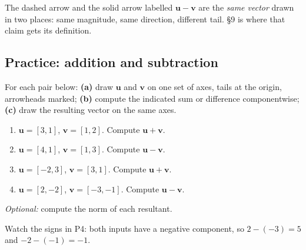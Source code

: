 \documentclass[11pt]{article}
\theoremstyle{definition}
\theoremstyle{remark}
\newcommand{\vc}[1]{\mathbf{#1}}
\newcommand{\lattice}[4]{%
  \draw[step=1cm,gray!25,very thin] (#1,#3) grid (#2,#4);
  \draw[axisline] (#1,0) -- (#2+0.45,0) node[right,font=\scriptsize,black]{$x$};
  \draw[axisline] (0,#3) -- (0,#4+0.45) node[above,font=\scriptsize,black]{$y$};
}
\begin{document}
\begin{center}
\end{center}

\noindent The dashed arrow and the solid arrow labelled $\vc{u}-\vc{v}$ are the
\emph{same vector} drawn in two places: same magnitude, same direction,
different tail. \S9 is where that claim gets its definition.

\subsection{Practice: addition and subtraction}
For each pair below: \textbf{(a)} draw $\vc{u}$ and $\vc{v}$ on one set of axes,
tails at the origin, arrowheads marked; \textbf{(b)} compute the indicated sum
or difference componentwise; \textbf{(c)} draw the resulting vector on the same
axes.

\begin{enumerate}[label=\textbf{P\arabic*.},leftmargin=2.8em,itemsep=7pt,
                  topsep=6pt]
  \item $\vc{u}=[3,1]$, \quad $\vc{v}=[1,2]$. \quad Compute $\vc{u}+\vc{v}$.
  \item $\vc{u}=[4,1]$, \quad $\vc{v}=[1,3]$. \quad Compute $\vc{u}-\vc{v}$.
  \item $\vc{u}=[-2,3]$, \quad $\vc{v}=[3,1]$. \quad Compute $\vc{u}+\vc{v}$.
  \item $\vc{u}=[2,-2]$, \quad $\vc{v}=[-3,-1]$. \quad Compute $\vc{u}-\vc{v}$.
\end{enumerate}

\medskip
\noindent\emph{Optional:} compute the norm of each resultant.

\smallskip
\noindent Watch the signs in P4: both inputs have a negative component, so
$2-(-3)=5$ and $-2-(-1)=-1$.
\end{document}
